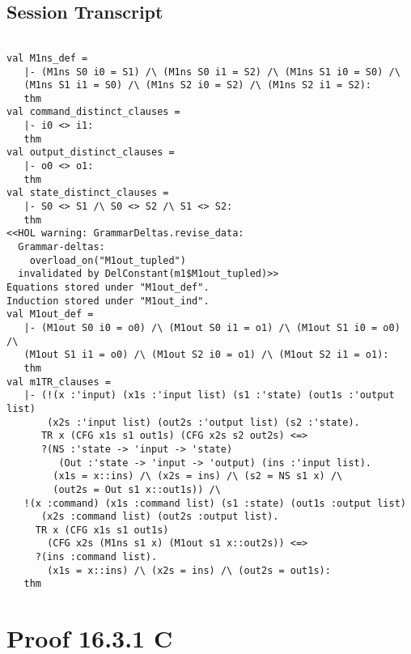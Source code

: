 \documentclass{report}
\begin{document}
\subsection{Session Transcript}
\label{trans2}
\begin{session}
  \begin{scriptsize}
\begin{verbatim}

val M1ns_def =
   |- (M1ns S0 i0 = S1) /\ (M1ns S0 i1 = S2) /\ (M1ns S1 i0 = S0) /\
   (M1ns S1 i1 = S0) /\ (M1ns S2 i0 = S2) /\ (M1ns S2 i1 = S2):
   thm
val command_distinct_clauses =
   |- i0 <> i1:
   thm
val output_distinct_clauses =
   |- o0 <> o1:
   thm
val state_distinct_clauses =
   |- S0 <> S1 /\ S0 <> S2 /\ S1 <> S2:
   thm
<<HOL warning: GrammarDeltas.revise_data: 
  Grammar-deltas:
    overload_on("M1out_tupled")
  invalidated by DelConstant(m1$M1out_tupled)>>
Equations stored under "M1out_def".
Induction stored under "M1out_ind".
val M1out_def =
   |- (M1out S0 i0 = o0) /\ (M1out S0 i1 = o1) /\ (M1out S1 i0 = o0) /\
   (M1out S1 i1 = o0) /\ (M1out S2 i0 = o1) /\ (M1out S2 i1 = o1):
   thm
val m1TR_clauses =
   |- (!(x :'input) (x1s :'input list) (s1 :'state) (out1s :'output list)
       (x2s :'input list) (out2s :'output list) (s2 :'state).
      TR x (CFG x1s s1 out1s) (CFG x2s s2 out2s) <=>
      ?(NS :'state -> 'input -> 'state)
         (Out :'state -> 'input -> 'output) (ins :'input list).
        (x1s = x::ins) /\ (x2s = ins) /\ (s2 = NS s1 x) /\
        (out2s = Out s1 x::out1s)) /\
   !(x :command) (x1s :command list) (s1 :state) (out1s :output list)
      (x2s :command list) (out2s :output list).
     TR x (CFG x1s s1 out1s)
       (CFG x2s (M1ns s1 x) (M1out s1 x::out2s)) <=>
     ?(ins :command list).
       (x1s = x::ins) /\ (x2s = ins) /\ (out2s = out1s):
   thm

\end{verbatim}
  \end{scriptsize}
\end{session}

\section{Proof 16.3.1 C}
\label{proof-3}
\end{document}
